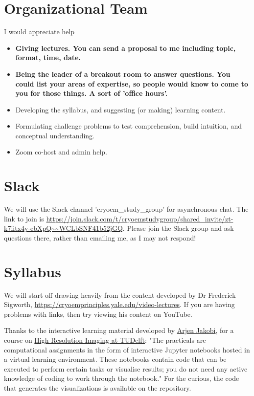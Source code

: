 \documentclass[11pt, oneside]{article}   	%
\begin{document}
\section{Organizational Team}

I would appreciate help 
\begin{itemize}
	\item {\bf Giving lectures. You can send a proposal to me including topic, format, time, date.}
	\item {\bf Being the leader of a breakout room to answer questions. You could list your areas of expertise, so people would know to come to you for those things. A sort of 'office hours'.}
	\item Developing the syllabus, and suggesting (or making) learning content.
	\item Formulating challenge problems to test comprehension, build intuition, and conceptual understanding.
	\item Zoom co-host and admin help.
\end{itemize}

\section{Slack}
We will use the Slack channel 'cryoem\_study\_group' for asynchronous chat. The link to join is 
{\tiny \url{https://join.slack.com/t/cryoemstudygroup/shared\_invite/zt-k7iitx4y-ebXpQ~~WCLbSNF41b52jGQ}}. Please join the Slack group and ask questions there, rather than emailing me, as I may not respond!


\section{Syllabus}
We will start off drawing heavily from the content developed by Dr Frederick Sigworth, \url{https://cryoemprinciples.yale.edu/video-lectures}. If you are having problems with links, then try viewing his content on YouTube.

Thanks to the interactive learning material developed by \href{http://cryoem.tudelft.nl/group/arjen-jakobi/}{Arjen Jakobi}, for a course on \href{https://gitlab.tudelft.nl/aj-lab/teaching/-/wikis/NB4020}{High-Resolution Imaging at TUDelft}: "The practicals are computational assignments in the form of interactive Jupyter notebooks hosted in a virtual learning environment. These notebooks contain code that can be executed to perform certain tasks or visualise results; you do not need any active knowledge of coding to work through the notebook." For the curious, the code that generates the visualizations is available on the repository.
\end{document}
